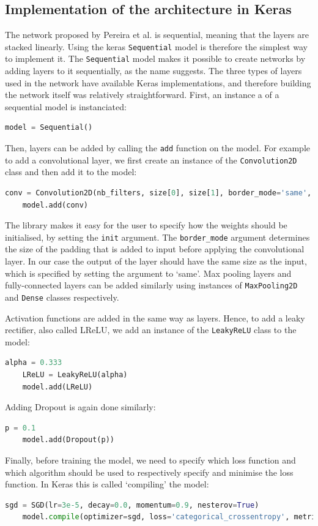 \documentclass[12pt,a4paper,twoside,openright]{report}
\begin{document}
\subsection{Implementation of the architecture in Keras}
The network proposed by Pereira et al. is sequential, meaning that the layers are stacked linearly. Using the keras \texttt{Sequential} model is therefore the simplest way to implement it. The \texttt{Sequential} model makes it possible to create networks by adding layers to it sequentially, as the name suggests. The three types of layers used in the network have available Keras implementations, and therefore building the network itself was relatively straightforward. First, an instance a of a sequential model is instanciated:
\begin{lstlisting}[language=Python]
	model = Sequential()
\end{lstlisting}
Then, layers can be added by calling the \texttt{add} function on the model. For example to add a convolutional layer, we first create an instance of the \texttt{Convolution2D} class and then add it to the model:
\begin{lstlisting}[language=Python]
	conv = Convolution2D(nb_filters, size[0], size[1], border_mode='same', init='glorot_normal')
	model.add(conv)
\end{lstlisting}
The library makes it easy for the user to specify how the weights should be initialised, by setting the \texttt{init} argument. The \texttt{border\_mode} argument determines the size of the padding that is added to input before applying the convolutional layer. In our case the output of the layer should have the same size as the input, which is specified by setting the argument to `same'. Max pooling layers and fully-connected layers can be added similarly using instances of \texttt{MaxPooling2D} and \texttt{Dense} classes respectively.

Activation functions are added in the same way as layers. Hence, to add a leaky rectifier, also called LReLU, we add an instance of the \texttt{LeakyReLU} class to the model:
\begin{lstlisting}[language=Python]
	alpha = 0.333
	LReLU = LeakyReLU(alpha)
	model.add(LReLU)
\end{lstlisting}
Adding Dropout is again done similarly:
\begin{lstlisting}[language=Python]
	p = 0.1
	model.add(Dropout(p))
\end{lstlisting}

Finally, before training the model, we need to specify which loss function and which algorithm should be used to respectively specify and minimise the loss function. In Keras this is called `compiling' the model:
\begin{lstlisting}[language=Python]
	sgd = SGD(lr=3e-5, decay=0.0, momentum=0.9, nesterov=True)
	model.compile(optimizer=sgd, loss='categorical_crossentropy', metrics=['accuracy']
\end{lstlisting}
\end{document}
